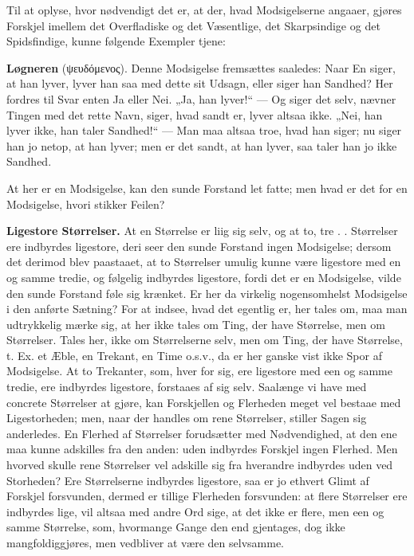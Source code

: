 \documentclass[12pt,a4paper]{book}
\begin{document}
Til at oplyse, hvor nødvendigt det er, at der, hvad Modsigelserne
angaaer, gjøres Forskjel imellem det Overfladiske og det Væsentlige,
det Skarpsindige og det Spidsfindige, kunne følgende Exempler tjene:

\textbf{Løgneren} (ψευδόμενος). Denne Modsigelse fremsættes saaledes:
Naar En siger, at han lyver, lyver han saa med dette sit Udsagn, eller
siger han Sandhed? Her fordres til Svar enten Ja eller Nei. „Ja, han
lyver!“ --- Og siger det selv, nævner Tingen med det rette Navn,
siger, hvad sandt er, lyver altsaa ikke. „Nei, han lyver ikke, han
taler Sandhed!“ --- Man maa altsaa troe, hvad han siger; nu siger han
jo netop, at han lyver; men er det sandt, at han lyver, saa taler han
jo ikke Sandhed.

At her er en Modsigelse, kan den sunde Forstand let fatte; men hvad er
det for en Modsigelse, hvori stikker Feilen?

\textbf{Ligestore Størrelser.} At en Størrelse er liig sig selv, og at
to, tre . . Størrelser ere indbyrdes ligestore, deri seer den sunde
Forstand ingen Modsigelse; dersom det derimod blev paastaaet, at to
Størrelser umulig kunne være ligestore med en og samme tredie, og
følgelig indbyrdes ligestore, fordi det er en Modsigelse, vilde den
sunde Forstand føle sig krænket. Er her da virkelig nogensomhelst
Modsigelse i den anførte Sætning? For at indsee, hvad det egentlig
er, her tales om, maa man udtrykkelig mærke sig, at her ikke tales om
Ting, der have Størrelse, men om Størrelser. Tales her, ikke om
Størrelserne selv, men om Ting, der have Størrelse, t. Ex. et Æble, en
Trekant, en Time o.s.v., da er her ganske vist ikke Spor af
Modsigelse. At to Trekanter, som, hver for sig, ere ligestore med een
og samme
tredie, ere indbyrdes ligestore, forstaaes af sig selv. Saalænge vi
have med concrete Størrelser at gjøre, kan Forskjellen og Flerheden
meget vel bestaae med Ligestorheden; men, naar der handles om rene
Størrelser, stiller Sagen sig anderledes. En Flerhed af Størrelser
forudsætter med Nødvendighed, at den ene maa kunne adskilles fra den
anden: uden indbyrdes Forskjel ingen Flerhed. Men hvorved skulle rene
Størrelser vel adskille sig fra hverandre indbyrdes uden ved
Storheden? Ere Størrelserne indbyrdes ligestore, saa er jo ethvert
Glimt af Forskjel forsvunden, dermed er tillige Flerheden forsvunden:
at flere Størrelser ere indbyrdes lige, vil altsaa med andre Ord sige,
at det ikke er flere, men een og samme Størrelse, som, hvormange Gange
den end gjentages, dog ikke mangfoldiggjøres, men vedbliver at være
den selvsamme.
\end{document}
